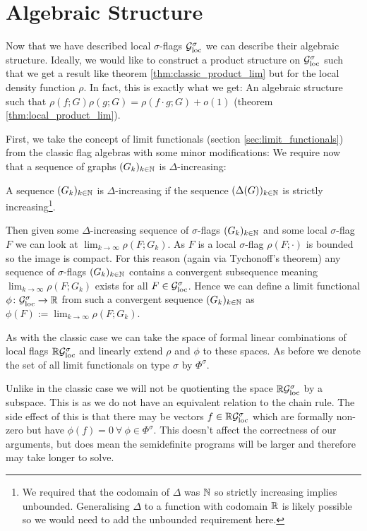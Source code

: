 \section{Algebraic Structure}

Now that we have described local $\sigma$-flags $\mathcal{G}_\mathrm{loc}^\sigma$ we can describe their
algebraic structure. Ideally, we would like to construct a product structure
on $\mathcal{G}_\mathrm{loc}^\sigma$ such that we get a result like theorem \ref{thm:classic_product_lim} but for
the local density function $\rho$. In fact, this is exactly what we get: An algebraic structure such
that $\rho(f; G)\rho(g;G) = \rho(f\cdot g; G) + o(1)$ (theorem \ref{thm:local_product_lim}).

First, we take the concept of limit functionals (section \ref{sec:limit_functionals})
from the classic flag algebras with some minor modifications:
We require now that a sequence of graphs $(G_k)_{k\in\mathbb{N}}$ is $\Delta$-increasing:
\begin{definition}
    A sequence $(G_k)_{k\in\mathbb{N}}$ is $\Delta$-increasing if the sequence
    $(\Delta(G))_{k\in\mathbb{N}}$ is strictly increasing\footnote{We required that the codomain of
    $\Delta$ was $\mathbb{N}$ so strictly increasing implies unbounded. Generalising $\Delta$
    to a function with codomain $\mathbb{R}$ is likely possible so we would need to add the
    unbounded requirement here.}.
\end{definition}
Then given some $\Delta$-increasing sequence of $\sigma$-flags $(G_k)_{k\in\mathbb{N}}$
and some local $\sigma$-flag
$F$ we can look at $\lim_{k\to\infty}\rho(F; G_k)$. As $F$ is a local $\sigma$-flag
$\rho(F; \cdot)$ is bounded so the image is compact. For this reason (again via Tychonoff's theorem)
any sequence of $\sigma$-flags $(G_k)_{k\in\mathbb{N}}$ contains a convergent subsequence meaning
$\lim_{k\to\infty}\rho(F; G_k)$ exists for all $F\in\mathcal{G}_\mathrm{loc}^\sigma$.
Hence we can define a limit functional $\phi\colon\mathcal{G}_\mathrm{loc}^\sigma\to\mathbb{R}$
from such a convergent sequence $(G_k)_{k\in\mathbb{N}}$ as $\phi(F):=\lim_{k\to\infty}\rho(F; G_k)$.

As with the classic case we can take the space of formal linear combinations of
local flags $\mathbb{R}\mathcal{G}_\mathrm{loc}^\sigma$ and linearly extend $\rho$ and $\phi$ to these
spaces. As before we denote the set of all limit functionals on type $\sigma$ by
$\Phi^\sigma$.

\begin{note}
    Unlike in the classic case we will not be quotienting the space $\mathbb{R}\mathcal{G}_\mathrm{loc}^\sigma$ by
    a subspace. This is as we do not have an equivalent relation to the chain rule.
    The side effect of this is that there may be vectors $f \in \mathbb{R}\mathcal{G}_\mathrm{loc}^\sigma$ which
    are formally non-zero but have $\phi(f) = 0\ \forall\ \phi\in\Phi^\sigma$.
    This doesn't affect the correctness of our arguments, but does mean the semidefinite
    programs will be larger and therefore may take longer to solve.
\end{note}

